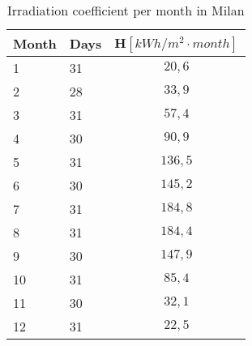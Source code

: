 \begin{table}[p]
\centering
\begin{tabular}{|l|l|c|}
\hline
\rowcolor{bluepoli!40} \textbf{Month} & \textbf{Days} & \multicolumn{1}{l|}{\textbf{H}$[kWh/m^2\cdot month]$} \\ \hline
1              & 31            & $20,6$                          \\ \hline
2              & 28            & $33,9$                          \\ \hline
3              & 31            & $57,4$                          \\ \hline
4              & 30            & $90,9$                          \\ \hline
5              & 31            & $136,5$                         \\ \hline
6              & 30            & $145,2$                         \\ \hline
7              & 31            & $184,8$                         \\ \hline
8              & 31            & $184,4$                         \\ \hline
9              & 30            & $147,9$                         \\ \hline
10             & 31            & $85,4$                          \\ \hline
11             & 30            & $32,1$                          \\ \hline
12             & 31            & $22,5$                          \\ \hline
\end{tabular}
\caption{Irradiation coefficient per month in Milan}
\label{tab:hmilan}
\end{table}